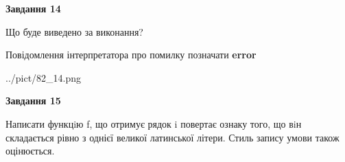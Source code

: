 \documentclass[11pt, ukrainian]{article}
\begin{document}
{\begin {large}
{\begin {center}\textbf{Завдання 14}\end {center}}\par
Що буде виведено за виконання? \par
Повідомлення інтерпретатора про помилку позначати \textbf{error}

\begin{center}
	{../pict/82_14.png}
\end{center}
\newpage

{\begin {center}\textbf{Завдання 15}\end {center}}\par

Написати функцiю f, що отримує рядок i повертає ознаку того, що вiн складається рівно з однієї великої латинської літери. Стиль запису умови також оцінюється.\par
\newpage

\end {large}}
\end{document}
